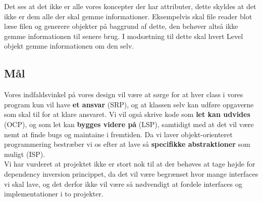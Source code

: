 Det ses at det ikke er alle vores koncepter der har attributer, dette skyldes at det ikke er dem alle der skal gemme informationer. Eksempelvis skal file reader blot læse filen og generere objekter på baggrund af dette, den behøver altså ikke gemme informationen til senere brug. I modsætning til dette skal hvert Level objekt gemme informationen om den selv.

\subsection{Mål}
   Vores indfaldsvinkel på vores design vil være at sørge for at hver class i vores program kun vil have \textbf{et ansvar} (SRP), og at klassen selv kan udføre opgaverne som skal til for at klare ansvaret. Vi vil også skrive kode som \textbf{let kan udvides} (OCP), og som let kan \textbf{bygges videre på} (LSP), samtidigt med at det vil være nemt at finde bugs og maintaine i fremtiden. Da vi laver objekt-orienteret programmering bestræber vi os efter at lave så \textbf{specifikke abstraktioner} som muligt (ISP).\\
   Vi har vurderet at projektet ikke er stort nok til at der behøves at tage højde for dependency inversion princippet, da det vil være begrænset hvor mange interfaces vi skal lave, og det derfor ikke vil være så nødvendigt at fordele interfaces og implementationer i to projekter. 